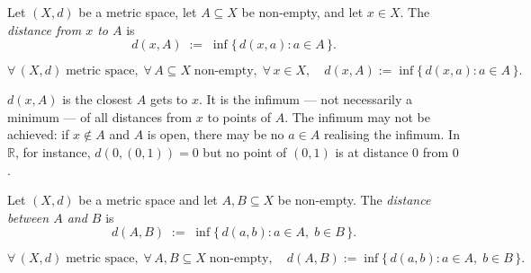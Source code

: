 \begin{tcolorbox}[colback=propbox, colframe=propborder, arc=2pt,
  left=6pt, right=6pt, top=4pt, bottom=4pt,
  title={\small\textbf{Definition (Distance from a Point to a Set)}},
  fonttitle=\small\bfseries]
\begin{definition}
\label{def:dist-point-set}
Let $(X, d)$ be a metric space, let $A \subseteq X$ be non-empty,
and let $x \in X$.
The \emph{distance from $x$ to $A$} is
\[
d(x, A) \;:=\; \inf\{\, d(x, a) : a \in A \,\}.
\]
\end{definition}
\end{tcolorbox}

\begin{remark*}
\[
\forall\,(X,d)\;\text{metric space},\;
\forall\,A \subseteq X\;\text{non-empty},\;
\forall\,x \in X,\quad
d(x,A) := \inf\{\, d(x,a) : a \in A \,\}.
\]
\end{remark*}

\begin{remark*}[Intuition]
$d(x, A)$ is the closest $A$ gets to $x$.
It is the infimum --- not necessarily a minimum --- of all distances from $x$
to points of $A$.
The infimum may not be achieved: if $x \notin A$ and $A$ is open, there may
be no $a \in A$ realising the infimum.
In $\mathbb{R}$, for instance, $d(0, (0,1)) = 0$ but no point of $(0,1)$
is at distance $0$ from $0$.
\end{remark*}

\begin{tcolorbox}[colback=propbox, colframe=propborder, arc=2pt,
  left=6pt, right=6pt, top=4pt, bottom=4pt,
  title={\small\textbf{Definition (Distance Between Sets)}},
  fonttitle=\small\bfseries]
\begin{definition}
\label{def:dist-sets}
Let $(X,d)$ be a metric space and let $A, B \subseteq X$ be non-empty.
The \emph{distance between $A$ and $B$} is
\[
d(A, B) \;:=\; \inf\{\, d(a, b) : a \in A,\; b \in B \,\}.
\]
\end{definition}
\end{tcolorbox}

\begin{remark*}
\[
\forall\,(X,d)\;\text{metric space},\;
\forall\,A,B \subseteq X\;\text{non-empty},\quad
d(A,B) := \inf\{\, d(a,b) : a \in A,\; b \in B \,\}.
\]
\end{remark*}

